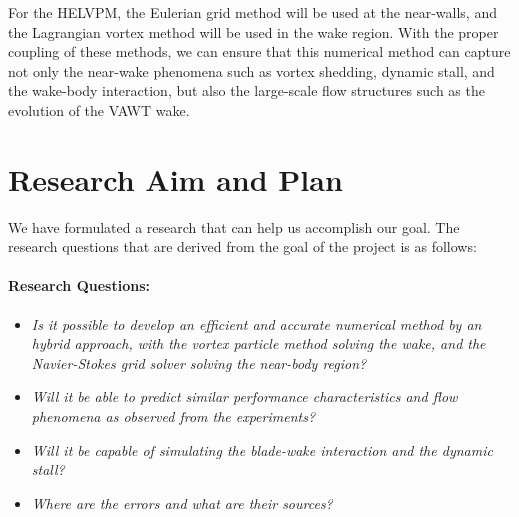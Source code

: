 For the HELVPM, the Eulerian grid method will be used at the near-walls, and the Lagrangian vortex method will be used in the wake region. With the proper coupling of these methods, we can ensure that this numerical method can capture not only the near-wake phenomena such as vortex shedding, dynamic stall, and the wake-body interaction, but also the large-scale flow structures such as the evolution of the VAWT wake.

\section{Research Aim and Plan}

We have formulated a research that can help us accomplish our goal. The research questions that are derived from the goal of the project is as follows:

\paragraph*{Research Questions:}
	\begin{itemize}
	\item \textit{Is it possible to develop an efficient and accurate numerical method by an
	hybrid approach, with the vortex particle method solving the wake, and the Navier-Stokes grid solver solving the near-body region?}
	
	\item \textit{Will it be able to predict similar performance characteristics and flow phenomena as observed from the experiments?}
	
	\item \textit{Will it be capable of simulating the blade-wake interaction and the dynamic stall?}
	
	\item \textit{Where are the errors and what are their sources?}
	\end{itemize}

